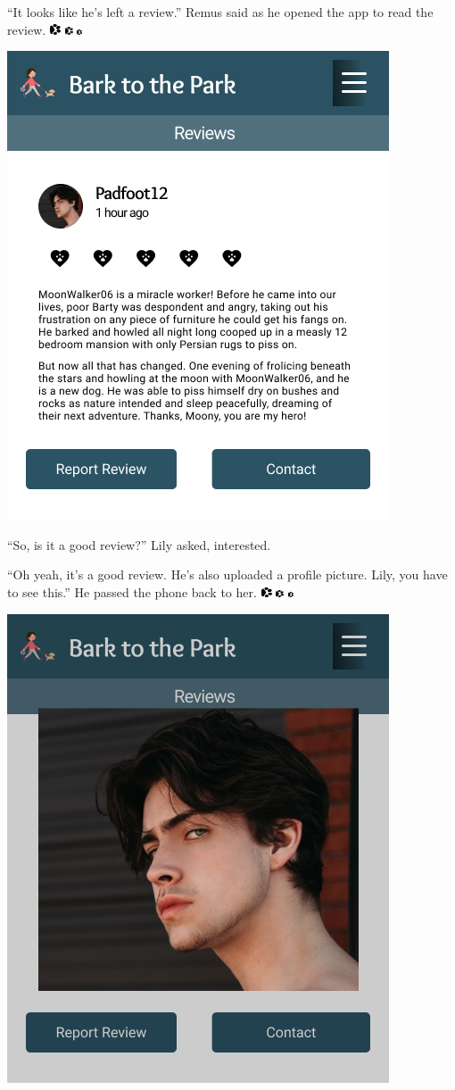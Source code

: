 \documentclass[12pt,twoside,openright]{memoir}
\newcommand{\pawsContinue}{
	\includegraphics[height=0.8em]{dogprint.pdf}\hspace{.2em}
	\includegraphics[height=0.6em]{dogprint.pdf}\hspace{.2em}
	\includegraphics[height=0.4em]{dogprint.pdf}\hspace{.2em}
}
\begin{document}
``It looks like he's left a review.'' Remus said as he opened the app to read the review.
\vfill\hfill\pawsContinue

{\hfill\includegraphics[height=\textheight]{Review RegularFont}\hfill}
 
``So, is it a good review?'' Lily asked, interested.

``Oh yeah, it's a good review. He's also uploaded a profile picture. Lily, you have to see this.'' He passed the phone back to her.
\vfill\hfill\pawsContinue

{\hfill\includegraphics[height=.9\textheight]{photo overlay}\hfill}
\end{document}
